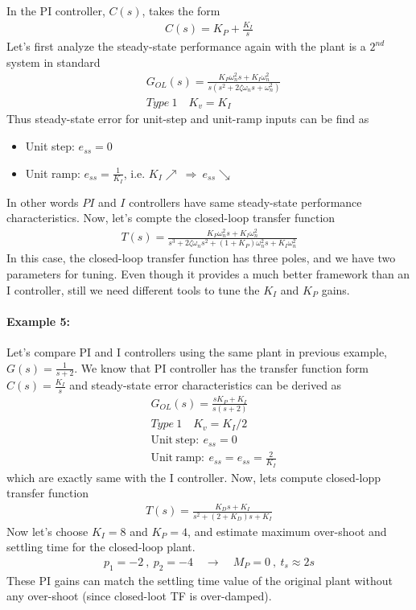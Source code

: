 \documentclass[twoside]{article}
\begin{document}
In the PI controller, $C(s)$, takes the form
%
\begin{align*}
 C(s) = K_P + \frac{K_I}{s}
\end{align*}
%
Let's first analyze the steady-state 
performance again with the plant is a $2^{nd}$ system in standard
%
\begin{align*}
  &G_{OL}(s) = \frac{K_P \omega_n^2 s +  K_I \omega_n^2}{s (s^2 + 2 \zeta
    \omega_n s + \omega_n^2)}
\\
 &Type \ 1 \quad K_v = K_I
\end{align*}
% 
Thus steady-state error for unit-step and unit-ramp inputs can be find
as
\begin{itemize}
\item Unit step: $e_{ss} = 0$ 
\item Unit ramp: $e_{ss} = \frac{1}{K_I}$, i.e. $K_I \nearrow \ \Rightarrow \ e_{ss} \searrow$  
\end{itemize}
In other words $PI$ and $I$ controllers have same steady-state
performance characteristics. Now, let's compte the closed-loop transfer function
%
\begin{align*}
T(s) = \frac{K_P \omega_n^2 s + K_I \omega_n^2}{s^3 + 2 \zeta \omega_n
  s^2 + (1 + K_P) \omega_n^2 s
  + K_I \omega_n^2}
\end{align*}
In this case, the closed-loop transfer function has three poles, 
and we have two parameters for tuning. Even though it provides a
much better framework than an I controller, still we need different tools
to tune the $K_I$ and $K_P$ gains.

\paragraph{Example 5:} Let's compare PI and I controllers using the
same plant in previous example, $G(s) = \frac{1}{s+2}$. We know that
PI controller has the transfer function form $C(s) = \frac{K_I}{s}$
and steady-state error characteristics can be derived as
%
\begin{align*}
  &G_{OL}(s) = \frac{s K_P + K_I }{s (s + 2)}
\\
 &Type \ 1 \quad K_v = K_I / 2
\\
&\mathrm{Unit} \ \mathrm{step :} \ e_{ss} = 0
\\
&\mathrm{Unit} \ \mathrm{ramp :} \ e_{ss} = e_{ss} = \frac{2}{K_I}
\end{align*}
% 
which are exactly same with the I controller. Now, lets
compute closed-lopp transfer function
%
\begin{align*}
  T(s) = \frac{K_D s + K_I}{s^2 + (2+K_D) s + K_I}
\end{align*}
%
Now let's choose $K_I = 8$ and $K_P = 4$, and estimate maximum
over-shoot and settling time for the closed-loop plant. 
%
\begin{align*}
p_{1} = -2 \ , \ p_{2} = -4
\quad \rightarrow \quad M_P = 0 \ , \ t_{s} \approx 2 s
\end{align*}
% 
These PI gains can match the settling time value
of the original plant without any over-shoot (since closed-loot
TF is over-damped).
\end{document}

